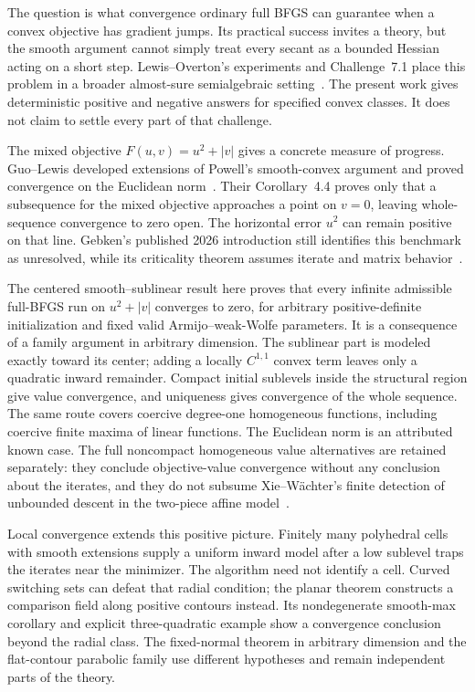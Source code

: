 The question is what convergence ordinary full BFGS can guarantee when a
convex objective has gradient jumps. Its practical success invites a
theory, but the smooth argument cannot simply treat every secant as a
bounded Hessian acting on a short step. Lewis--Overton's experiments and
Challenge~7.1 place this problem in a broader almost-sure semialgebraic
setting~\cite{LO}. The present work gives deterministic positive and negative
answers for specified convex classes. It does not claim to settle every
part of that challenge.

The mixed objective $F(u,v)=u^2+|v|$ gives a concrete measure of progress.
Guo--Lewis developed extensions of Powell's smooth-convex argument and
proved convergence on the Euclidean norm~\cite[Theorems~3.2, 4.1, 4.3 and
Corollary~4.2]{GL18}. Their Corollary~4.4 proves only that a subsequence for
the mixed objective approaches a point on $v=0$, leaving whole-sequence
convergence to zero open. The horizontal error $u^2$ can remain positive on
that line. Gebken's published 2026 introduction still identifies this
benchmark as unresolved, while its criticality theorem assumes iterate
and matrix behavior~\cite[Theorem~3.1 and (B1)]{BG}.

The centered smooth--sublinear result here proves that every infinite
admissible full-BFGS run on $u^2+|v|$ converges to zero, for arbitrary
positive-definite initialization and fixed valid Armijo--weak-Wolfe
parameters. It is a consequence of a family argument in arbitrary dimension.
The sublinear part is modeled exactly toward its center; adding a locally
$C^{1,1}$ convex term leaves only a quadratic inward remainder. Compact
initial sublevels inside the structural region give value convergence,
and uniqueness gives convergence of the whole sequence. The same route
covers coercive degree-one homogeneous functions, including coercive finite
maxima of linear functions. The Euclidean norm is an attributed known case.
The full noncompact homogeneous value alternatives are retained separately:
they conclude objective-value convergence without any conclusion about the iterates, and they do not subsume
Xie--W\"achter's finite detection of unbounded descent in the two-piece
affine model~\cite[Theorem~IV.1]{XW}.

Local convergence extends this positive picture. Finitely many polyhedral
cells with smooth extensions supply a uniform inward model after a low
sublevel traps the iterates near the minimizer. The algorithm need not
identify a cell. Curved switching sets can defeat that radial condition;
the planar theorem constructs a comparison field along positive contours
instead. Its nondegenerate smooth-max corollary and explicit three-quadratic
example show a convergence conclusion beyond the radial class. The
fixed-normal theorem in arbitrary dimension and the flat-contour parabolic
family use different hypotheses and remain independent parts of the theory.


